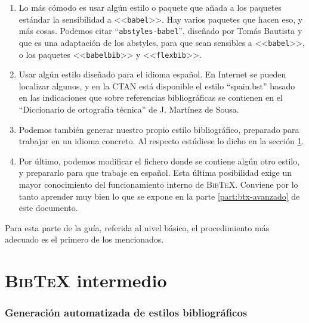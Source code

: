\documentclass[a4paper,11pt]{article}
\def\btx-{\textsc{Bib\TeX}}
\def\ltr#1-{<<\texttt{#1}>>}
\begin{document}
\begin{enumerate}

\item Lo más  cómodo es usar algún  estilo o paquete que añada  a los paquetes
  estándar la sensibilidad a \ltr babel-. Hay varios paquetes que hacen eso, y
  más  cosas.  Podemos citar  ``\texttt{abstyles-babel}'', diseñado  por Tomás
  Bautista y que es una adaptación  de los abstyles, para que sean sensibles a
  \ltr babel-, o los paquetes \ltr babelbib- y \ltr flexbib-.

\item Usar algún estilo diseñado para el idioma español. En Internet se pueden
  localizar  algunos, y  en la  CTAN está  disponible el  estilo ``spain.bst''
  basado en las indicaciones que sobre referencias bibliográficas se contienen
  en el ``Diccionario de ortografía técnica'' de J.  Martínez de Sousa.

\item Podemos  también generar nuestro propio  estilo bibliográfico, preparado
  para trabajar en  un idioma concreto.  Al respecto estúdiese  lo dicho en la
  sección \ref{sec:como-crear-estilos}.

\item Por  último, podemos modificar el  fichero donde se  contiene algún otro
  estilo, y  prepararlo para que  trabaje en español. Esta  última posibilidad
  exige un  mayor conocimiento del  funcionamiento interno de  \btx-. Conviene
  por  lo   tanto  aprender   muy  bien   lo  que  se   expone  en   la  parte
  \ref{part:btx-avanzado} de este documento.

\end{enumerate}

Para esta  parte de la  guía, referida al  nivel básico, el  procedimiento más
adecuado es el primero de los mencionados.

\clearpage

\part{\btx- intermedio}
\label{part:btx-intermedio}

\section{Generación automatizada de estilos bibliográficos}
\label{sec:como-crear-estilos}
\end{document}
